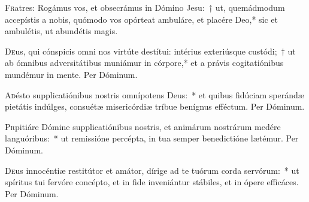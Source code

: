 \documentclass[vesperale_romanum.tex]{subfiles}
\begin{document}

\capitulum


\lettrine{F}{r}atres: Rogámus vos, et obsecrámus in Dómino Jesu:~† ut, quemádmodum accepístis a nobis, quómodo vos opórteat ambuláre, et placére Deo,* sic et ambulétis, ut abundétis magis.



\oratio

\lettrine{D}{e}us, qui cónspicis omni nos virtúte destítui: intérius exteriúsque custódi;~† ut ab ómnibus adversitátibus muniámur in córpore,* et a právis cogitatiónibus mundémur in mente. Per Dóminum.






\oratio

\lettrine{A}{d}ésto supplicatiónibus nostris omnípotens Deus:~* et quibus fidúciam sperándæ pietátis indúlges, consuétæ misericórdiæ tríbue benígnus efféctum. Per Dóminum.



\oratio

\lettrine{P}{r}pitiáre Dómine supplicatiónibus nostris, et animárum nostrárum medére languóribus:~* ut remissióne percépta, in tua semper benedictióne lætémur. Per Dóminum.



\oratio

\lettrine{D}{e}us innocéntiæ restitútor et amátor, dírige ad te tuórum corda servórum:~* ut spíritus tui fervóre concépto, et in fide inveniántur stábiles, et in ópere efficáces. Per Dóminum.
\end{document}
